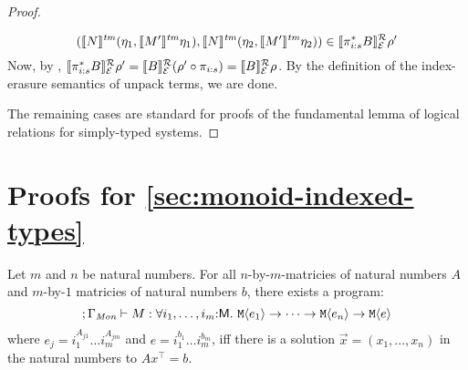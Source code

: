 \begin{proof}
\begin{description}
\begin{displaymath}
      (\llbracket N \rrbracket^{\mathit{tm}}(\eta_1,\llbracket M' \rrbracket^{\mathit{tm}}\eta_1),
       \llbracket N \rrbracket^{\mathit{tm}}(\eta_2,\llbracket M' \rrbracket^{\mathit{tm}}\eta_2)) \in \llbracket \pi_{i\mathord:s}^*B \rrbracket^{\mathcal{R}}_{\mathcal{E}}{\rho'}
    \end{displaymath}
    Now, by ,
    $\llbracket \pi_{i\mathord:s}^*B \rrbracket^{\mathcal{R}}_{\mathcal{E}}{\rho'} =
    \llbracket B \rrbracket^{\mathcal{R}}_{\mathcal{E}}{(\rho' \circ \pi_{i\mathord:s})} =
    \llbracket B \rrbracket^{\mathcal{R}}_{\mathcal{E}}{\rho}$. By the definition of the
    index-erasure semantics of $\mathrm{unpack}$ terms, we are done.
  \end{description}
  The remaining cases are standard for proofs of the fundamental lemma
  of logical relations for simply-typed systems.
\end{proof}

\section{Proofs for \autoref{sec:monoid-indexed-types}}

\begin{restateTheorem}
  Let $m$ and $n$ be natural numbers. For all $n$-by-$m$-matricies of
  natural numbers $A$ and $m$-by-$1$ matricies of natural numbers $b$,
  there exists a program:
  \begin{equation}
    \label{eq-appendix:fo-monoid-type}
    ; \Gamma_\Mon \vdash M : \forall i_1,\dots,i_m\mathord:\mathsf{M}.\ \tyPrim{M}{e_1} \to \dots \to \tyPrim{M}{e_n} \to \tyPrim{M}{e}
  \end{equation}
  where $e_j = i_1^{A_{j1}}\dots i_m^{A_{jm}}$ and $e = i_1^{b_1}\dots
  i_m^{b_m}$, iff there is a solution $\vec{x} = (x_1,...,x_n)$ in the
  natural numbers to $A x^\top = b$.
\end{restateTheorem}


